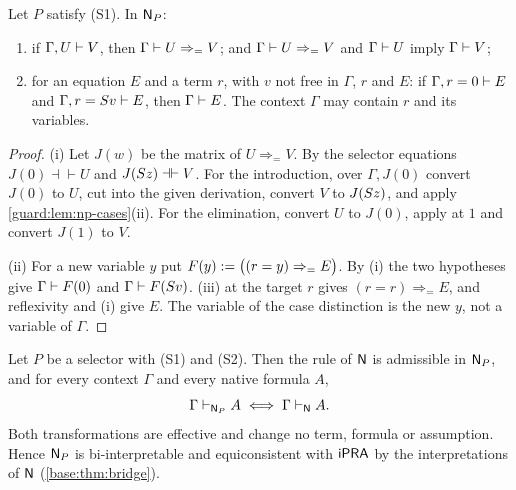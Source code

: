 \begin{lemma}
\label{guard:lem:np-imp}
Let $P$ satisfy \textup{(S1)}.  In $\mathsf{N}_P$:
\begin{enumerate}[label=\textup{(\roman*)}]
\item if $\Gamma,U\vdash V$, then $\Gamma\vdash U\Rightarrow_{=}V$; and
 $\Gamma\vdash U\Rightarrow_{=}V$ and $\Gamma\vdash U$ imply
 $\Gamma\vdash V$;
\item for an equation $E$ and a term $r$, with $v$ not free in $\Gamma$,
 $r$ and $E$: if $\Gamma,r=0\vdash E$ and $\Gamma,r=S v\vdash E$, then
 $\Gamma\vdash E$.  The context $\Gamma$ may contain $r$ and its
 variables.
\end{enumerate}
\end{lemma}

\begin{proof}
(i) Let $J(w)$ be the matrix of $U\Rightarrow_{=}V$.  By the selector
equations $J(0)\dashv\vdash U$ and $J(S z)\dashv\vdash V$.  For the
introduction, over $\Gamma,J(0)$ convert $J(0)$ to $U$, cut into the given
derivation, convert $V$ to $J(S z)$, and apply
\cref{guard:lem:np-cases}(ii).  For the elimination, convert $U$ to $J(0)$,
apply  at $1$ and convert $J(1)$ to $V$.

(ii) For a new variable $y$ put $F(y)\mathrel{:=}\bigl((r=y)\Rightarrow_{=}E\bigr)$.
By (i) the two hypotheses give $\Gamma\vdash F(0)$ and
$\Gamma\vdash F(S v)$.  (iii) at the target $r$
gives $(r=r)\Rightarrow_{=}E$, and reflexivity and (i) give $E$.  The
variable of the case distinction is the new $y$, not a variable of
$\Gamma$.
\end{proof}

\begin{theorem}
\label{guard:thm:selector}
Let $P$ be a selector with \textup{(S1)} and \textup{(S2)}.  Then the rule
 of $\mathsf{N}$ is admissible in $\mathsf{N}_P$, and for every context
$\Gamma$ and every native formula $A$,
\[
 \Gamma\vdash_{\mathsf{N}_P}A\iff\Gamma\vdash_{\mathsf{N}}A .
\]
Both transformations are effective and change no term, formula or
assumption.  Hence $\mathsf{N}_P$ is bi-interpretable and equiconsistent with
$\mathsf{iPRA}$ by the interpretations of $\mathsf{N}$ (\cref{base:thm:bridge}).
\end{theorem}

